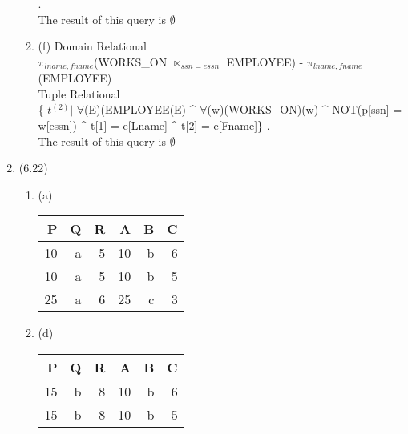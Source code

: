 \documentclass[11pt,fleqn]{article}
\begin{document}
\begin{enumerate}
\begin{enumerate}
.\\
The result of this query is $\emptyset$
  \item   (f) 
Domain Relational\\ $\pi_{lname, fname}$(WORKS\_ON $\Join_{ssn=essn}$ EMPLOYEE) - $\pi_{lname,fname}$(EMPLOYEE) \\
Tuple Relational\\
\{ $t^{(2)} | $  $\forall$(E)(EMPLOYEE(E) \^{} $\forall$(w)(WORKS\_ON)(w) \^{} NOT(p[ssn] = w[essn]) \^{} t[1] = e[Lname] \^{} t[2] = e[Fname]\}
.\\
The result of this query is $\emptyset$
  \end{enumerate}
\item (6.22)  %
	\begin{enumerate}
	\item (a) 
\begin{tabular}{|r|r|r|r|r|r|}
  \hline
P&Q&R&A&B&C \\
  \hline
10 & a & 5 & 10 & b & 6 \\
10 & a & 5 & 10 & b & 5 \\
25 & a & 6 & 25 & c & 3 \\
  \hline
\end{tabular}
	\item (d) 
 \begin{tabular}{|r|r|r|r|r|r|}
\hline
P&Q&R&A&B&C \\
  \hline
15 & b & 8 & 10 & b & 6 \\
15 & b & 8 & 10 & b & 5 \\
  \hline
\end{tabular}
	\end{enumerate}

\end{enumerate}
\end{document}
